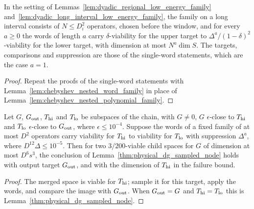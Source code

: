 \begin{lemma}
    \label{lem:dyadic_long_interval_low_energy_word_family}
    \leanok
    In the setting of Lemmas~\ref{lem:dyadic_regional_low_energy_family}
    and~\ref{lem:dyadic_long_interval_low_energy_family}, the family on a
    long interval consists of $N\le D_i^2$ operators, chosen before the
    window, and for every $a\ge0$ the words of length $a$ carry
    $\delta$-viability for the upper target to
    $\Delta^a/(1-\delta)^2$-viability for the lower target, with dimension
    at most $N^a\dim S$. The targets, comparisons and suppression are those
    of the single-word statements, which are the case $a=1$.
\end{lemma}
\begin{proof}\leanok
    Repeat the proofs of the single-word statements with
    Lemma~\ref{lem:chebyshev_nested_word_family} in place of
    Lemma~\ref{lem:chebyshev_nested_polynomial_family}.
\end{proof}

\begin{lemma}
    \label{lem:sampled_parent_two_windows}
    \leanok
    Let $G$, $G_{\rm out}$, $T_{\rm hi}$ and $T_{\rm lo}$ be subspaces of
    the chain, with $G\ne0$, $G$ $\epsilon$-close to $T_{\rm hi}$ and
    $T_{\rm lo}$ $\epsilon$-close to $G_{\rm out}$, where
    $\epsilon\le10^{-4}$. Suppose the words of a fixed family of at most
    $D^2$ operators carry viability for $T_{\rm hi}$ to viability for
    $T_{\rm lo}$ with suppression $\Delta^a$, where $D^{12}\Delta\le10^{-5}$.
    Then for two $3/200$-viable child spaces for $G$ of dimension at most
    $D^6s^3$, the conclusion of Lemma~\ref{thm:physical_dg_sampled_node}
    holds with output target $G_{\rm out}$, and with the dimension of
    $T_{\rm hi}$ in the failure bound.
\end{lemma}
\begin{proof}\leanok
    The merged space is viable for $T_{\rm hi}$; sample it for this target,
    apply the words, and compare the image with $G_{\rm out}$. When
    $G_{\rm out}=G$ and $T_{\rm hi}=T_{\rm lo}$ this is
    Lemma~\ref{thm:physical_dg_sampled_node}.
\end{proof}


